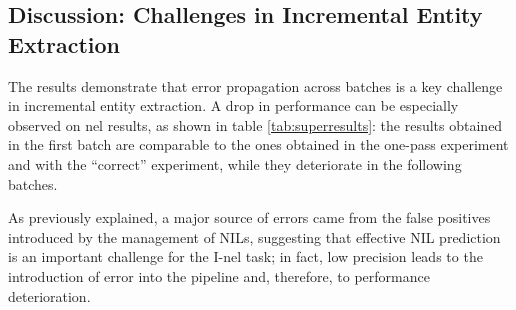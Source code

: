 \subsection{Discussion: Challenges in Incremental Entity Extraction} \label{sec:futures}
The results demonstrate that error propagation across batches is a key challenge in incremental entity extraction. A drop in performance can be especially observed on \ac{nel} results, as shown in table \ref{tab:superresults}: the results obtained in the first batch are comparable to the ones obtained in the one-pass experiment and with the ``correct'' experiment, while they deteriorate in the following batches.





As previously explained, a major source of errors came from the false positives introduced by the management of NILs, suggesting that effective NIL prediction is an important challenge for the I-\ac{nel} task; in fact, low precision leads to the introduction of error into the pipeline and, therefore, to performance deterioration. %


